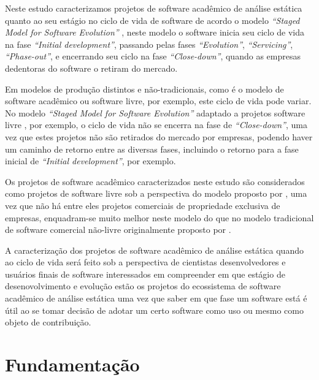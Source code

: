 Neste estudo caracterizamos projetos de software acadêmico de análise
estática quanto ao seu estágio no ciclo de vida de software de acordo o modelo
{\it ``Staged Model for Software Evolution''}
\cite{rajlich2000staged}, neste modelo o software inicia seu ciclo de
vida na fase {\it ``Initial development''}, passando pelas fases {\it
``Evolution''}, {\it ``Servicing''}, {\it ``Phase-out''}, e encerrando seu ciclo
na fase {\it ``Close-down''}, quando as empresas dedentoras do
software o retiram do mercado.

Em modelos de produção distintos e não-tradicionais, como é o modelo de
software acadêmico ou software livre, por exemplo, este ciclo de vida pode
variar. No modelo {\it ``Staged Model for Software Evolution''} adaptado a
projetos software livre \cite{capiluppi2007adapting}, por exemplo, o ciclo de
vida não se encerra na fase de {\it ``Close-down''}, uma vez que estes projetos
não são retirados do mercado por empresas, podendo haver um caminho de retorno
entre as diversas fases, incluindo o retorno para a fase inicial de {\it
``Initial development''}, por exemplo.

Os projetos de software acadêmico caracterizados neste estudo são considerados
como projetos de software livre sob a perspectiva do modelo proposto por
, uma vez que não há entre eles projetos
comerciais de propriedade exclusiva de empresas, enquadram-se muito melhor
neste modelo do que no modelo tradicional de software comercial não-livre
originalmente proposto por .

A caracterização dos projetos de software acadêmico de análise estática quando
ao ciclo de vida será feito sob a perspectiva de cientistas desenvolvedores e
usuários finais de software interessados em compreender em que estágio de
desenovolvimento e evolução estão os projetos do ecossistema de software
acadêmico de análise estática uma vez que saber em que fase um software está é
útil ao se tomar decisão de adotar um certo software como uso ou mesmo como
objeto de contribuição.


\section{Fundamentação} \label{estudo3:fundamentacao}

